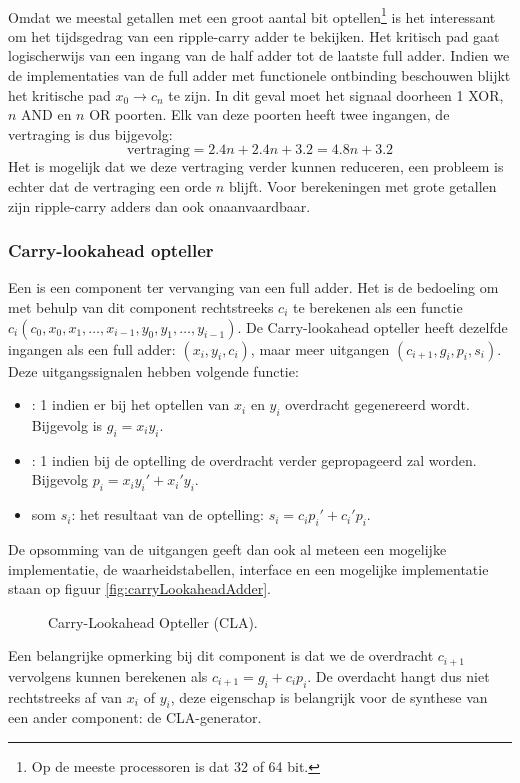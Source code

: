 \paragraph{}
Omdat we meestal getallen met een groot aantal bit optellen\footnote{Op de meeste processoren is dat 32 of 64 bit.} is het interessant om het tijdsgedrag van een ripple-carry adder te bekijken. Het kritisch pad gaat logischerwijs van een ingang van de half adder tot de laatste full adder. Indien we de implementaties van de full adder met functionele ontbinding beschouwen blijkt het kritische pad $x_0\rightarrow c_n$ te zijn. In dit geval moet het signaal doorheen 1 XOR, $n$ AND en $n$ OR poorten. Elk van deze poorten heeft twee ingangen, de vertraging is dus bijgevolg:
\begin{equation}
\mbox{vertraging}=2.4n+2.4n+3.2=4.8n+3.2
\end{equation}
Het is mogelijk dat we deze vertraging verder kunnen reduceren, een probleem is echter dat de vertraging een orde $n$ blijft. Voor berekeningen met grote getallen zijn ripple-carry adders dan ook onaanvaardbaar.
\subsubsection{Carry-lookahead opteller}
Een  is een component ter vervanging van een full adder. Het is de bedoeling om met behulp van dit component rechtstreeks $c_i$ te berekenen als een functie $c_i\left(c_0,x_0,x_1,\ldots,x_{i-1},y_0,y_1,\ldots,y_{i-1}\right)$. De Carry-lookahead opteller heeft dezelfde ingangen als een full adder: $(x_i,y_i,c_i)$, maar meer uitgangen $(c_{i+1},g_i,p_i,s_i)$. Deze uitgangssignalen hebben volgende functie:
\begin{itemize}
 \item {}: 1 indien er bij het optellen van $x_i$ en $y_i$ overdracht gegenereerd wordt. Bijgevolg is $g_i=x_iy_i$.
 \item {}: 1 indien bij de optelling de overdracht verder gepropageerd zal worden. Bijgevolg $p_i=x_iy_i'+x_i'y_i$.
 \item som $s_i$: het resultaat van de optelling: $s_i=c_ip_i'+c_i'p_i$.
\end{itemize}
De opsomming van de uitgangen geeft dan ook al meteen een mogelijke implementatie, de waarheidstabellen, interface en een mogelijke implementatie staan op figuur \ref{fig:carryLookaheadAdder}.
\begin{figure}[hbt]
\centering
{}
\caption{Carry-Lookahead Opteller (CLA).}
\end{figure}
Een belangrijke opmerking bij dit component is dat we de overdracht $c_{i+1}$ vervolgens kunnen berekenen als $c_{i+1}=g_i+c_ip_i$. De overdacht hangt dus niet rechtstreeks af van $x_i$ of $y_i$, deze eigenschap is belangrijk voor de synthese van een ander component: de CLA-generator.
